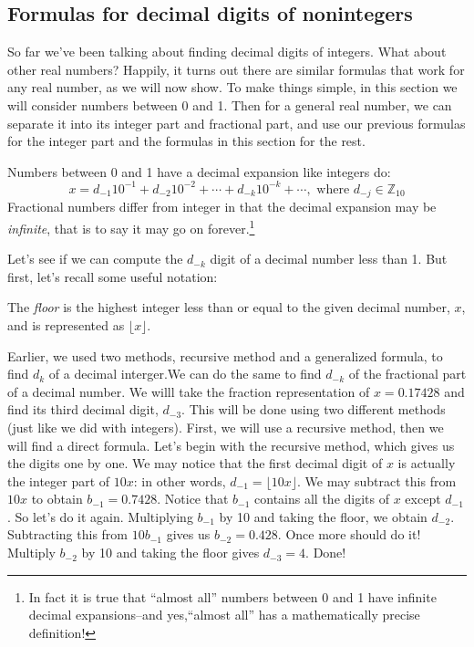 \subsection{Formulas for  decimal digits of nonintegers}
So far we've been talking about finding decimal digits of integers. What about other real numbers? Happily, it turns out there are similar formulas that work for  any real number, as we will now show. To make things simple, in this section we will consider numbers between 0 and 1. Then for a general real number, we can separate it into its integer part and fractional part, and use our previous formulas for the integer part and the formulas in this section for the rest.

Numbers between 0 and 1 have a decimal expansion like integers do:
\begin{equation}
x=d_{-1}10^{-1}+d_{-2}10^{-2}+\cdots+d_{-k}10^{-k}+\cdots,  \text{  where } d_{-j}\in \mathbb{Z}_{10}
\end{equation}
Fractional numbers differ from integer in that the decimal expansion may be \emph{infinite}, that is to say it may go on forever.\footnote{In fact it is true that ``almost all'' numbers between 0 and 1 have infinite decimal expansions--and yes,``almost all''  has a mathematically precise definition!}

Let's see if we can compute the $d_{-k}$ digit of a decimal number less than 1. But first, let's recall some useful notation:

\begin{defn}\label{floor} 
The \textit{floor} is the highest integer less than or equal to the given decimal number, $x$, and  is represented as $\lfloor x \rfloor$.
\end{defn}

Earlier, we used two methods, recursive method and a generalized formula, to find $d_k$ of a decimal interger.We can do the same to find $d_{-k}$ of the fractional part of a decimal number. We willl take the fraction representation of $x=0.17428$ and find its third decimal digit, $d_{-3}$. This will be done using two different methods (just like we did with integers). First, we will use a recursive method, then we will find a direct formula. Let's begin with the recursive method, which gives us the digits one by one. We may notice that the first decimal digit of $x$ is actually the integer part of $10x$: in other words, $d_{-1} = \lfloor 10x \rfloor$. We may subtract this from $10x$ to obtain $b_{-1} = 0.7428$.  Notice that $b_{-1}$ contains all the digits of $x$ except $d_{-1}$. So let's do it again.  Multiplying $b_{-1}$ by 10 and taking the floor, we obtain $d_{-2}$. Subtracting this from $10b_{-1}$ gives us $b_{-2} = 0.428$.  Once more should do it!  Multiply $b_{-2}$ by 10 and taking the floor gives $d_{-3} = 4$. Done!

